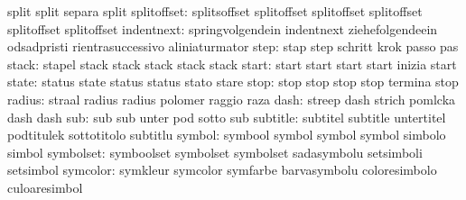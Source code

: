                            split                     split
                           separa                    split %
splitoffset: splitsoffset        splitoffset
             splitoffset         splitoffset
             splitoffset         splitoffset %
               indentnext: springvolgendein          indentnext
                           ziehefolgendeein          odsadpristi
                           rientrasuccessivo         aliniaturmator
                     step: stap                      step
                           schritt                   krok
                           passo                     pas
                    stack: stapel                    stack
                           stack                     stack
                           stack                     stack %
                    start: start                     start
                           start                     start
                           inizia                    start
                    state: status                    state
                           status                    status
                           stato                     stare
                     stop: stop                      stop
                           stop                      stop
                           termina                   stop
                   radius: straal                    radius
                           radius                    polomer
                           raggio                    raza
                     dash: streep                    dash
                           strich                    pomlcka
                           dash                      dash %
                      sub: sub                       sub
                           unter                     pod
                           sotto                     sub
                 subtitle: subtitel                  subtitle
                           untertitel                podtitulek
                           sottotitolo               subtitlu
                   symbol: symbool                   symbol
                           symbol                    symbol
                           simbolo                   simbol
                symbolset: symboolset                symbolset
                           symbolset                 sadasymbolu
                           setsimboli                setsimbol
                 symcolor: symkleur                  symcolor
                           symfarbe                  barvasymbolu
                           coloresimbolo             culoaresimbol
